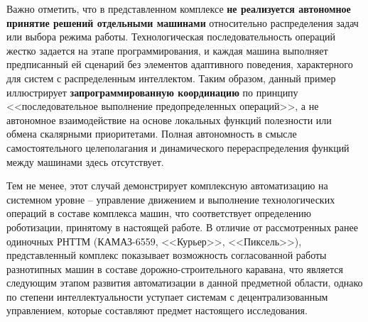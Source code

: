 Важно отметить, что в представленном комплексе \textbf{не реализуется автономное принятие решений отдельными машинами} относительно распределения задач или выбора режима работы. Технологическая последовательность операций жестко задается на этапе программирования, и каждая машина выполняет предписанный ей сценарий без элементов адаптивного поведения, характерного для систем с распределенным интеллектом. Таким образом, данный пример иллюстрирует \textbf{запрограммированную координацию} по принципу <<последовательное выполнение предопределенных операций>>, а не автономное взаимодействие на основе локальных функций полезности или обмена скалярными приоритетами. Полная автономность в смысле самостоятельного целеполагания и динамического перераспределения функций между машинами здесь отсутствует.

Тем не менее, этот случай демонстрирует комплексную автоматизацию на системном уровне -- управление движением и выполнение технологических операций в составе комплекса машин, что соответствует определению роботизации, принятому в настоящей работе. В отличие от рассмотренных ранее одиночных РНТТМ (КАМАЗ-6559, <<Курьер>>, <<Пиксель>>), представленный комплекс показывает возможность согласованной работы разнотипных машин в составе дорожно-строительного каравана, что является следующим этапом развития автоматизации в данной предметной области, однако по степени интеллектуальности уступает системам с децентрализованным управлением, которые составляют предмет настоящего исследования.